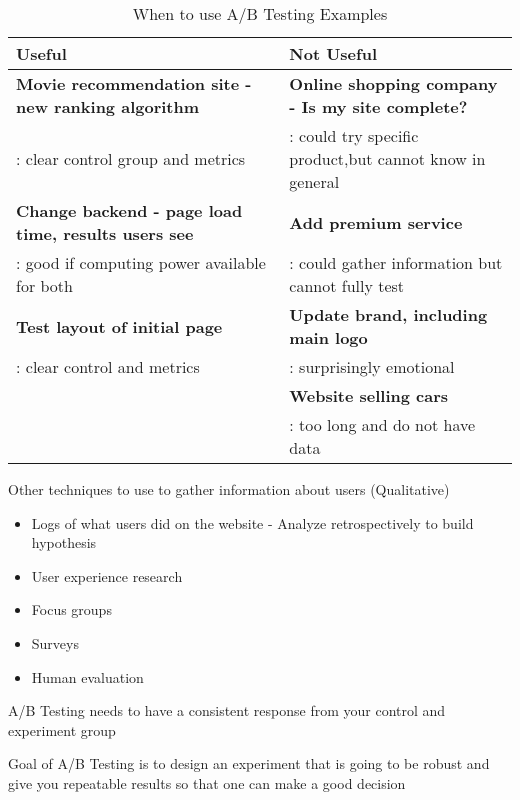 \documentclass[10pt]{article}
\theoremstyle{definition}
\begin{document}
\begin{center}
\begin{table}[h]
\centering
\caption{When to use A/B Testing Examples}
\begin{tabular}{ |l|l|}
  \hline
  \textbf{Useful} & \textbf{Not Useful} \\
  \hline
  \textbf{Movie recommendation site - new ranking algorithm} & \textbf{Online shopping company - Is my site complete?}\\ :  clear control group and metrics & : could try specific product,but cannot know in general  \\
  \textbf{Change backend - page load time, results users see} & \textbf{Add premium service} \\
  : good if computing power available for both & : could gather information but cannot fully test \\ 
  \textbf{Test layout of initial page} & \textbf{Update brand, including main logo} \\ : clear control and metrics & : surprisingly emotional \\
  & \textbf{Website selling cars} \\ 
  & : too long and do not have data \\
  \hline
\end{tabular}
\end{table}
\end{center}
Other techniques to use to gather information about users (Qualitative)
\begin{itemize}
    \item Logs of what users did on the website - Analyze retrospectively to build hypothesis
     \item User experience research
     \item Focus groups
     \item Surveys
     \item Human evaluation
\end{itemize}

A/B Testing needs to have a consistent response from your control and experiment group 

Goal of A/B Testing is to design an experiment that is going to be robust and give you repeatable results so that one can make a good decision 
\end{document}
